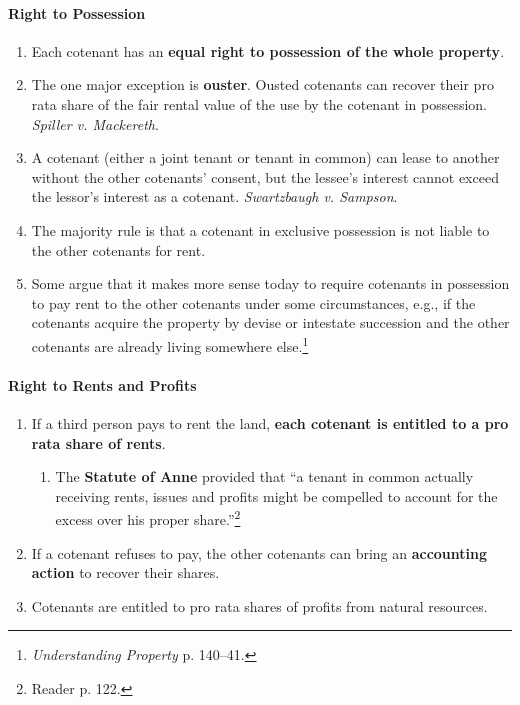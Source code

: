 \paragraph{Right to Possession}

\begin{enumerate}
    \item Each cotenant has an \textbf{equal right to possession of the whole 
    property}.
    \item The one major exception is \textbf{ouster}. Ousted cotenants can 
    recover their pro rata share of the fair rental value of the use by the 
    cotenant in possession. \emph{Spiller v. Mackereth}.
    \item A cotenant (either a joint tenant or tenant in common)  can lease to 
    another without the other cotenants' consent, but the lessee's interest 
    cannot exceed the lessor's interest as a cotenant.  \emph{Swartzbaugh v. 
    Sampson}.
    \item The majority rule is that a cotenant in exclusive possession is not 
    liable to the other cotenants for rent.
    \item Some argue that it makes more sense today to require cotenants in 
    possession to pay rent to the other cotenants under some circumstances, 
    e.g., if the cotenants acquire the property by devise or intestate 
    succession and the other cotenants are already living somewhere 
    else.\footnote{\emph{Understanding Property} p. 140--41.}
\end{enumerate}

\paragraph{Right to Rents and Profits}

\begin{enumerate}
    \item If a third person pays to rent the land, \textbf{each cotenant is entitled 
    to a pro rata share of rents}.
    \begin{enumerate}
        \item The \textbf{Statute of Anne} provided that ``a tenant in common 
        actually receiving rents, issues and profits might be compelled to 
        account for the excess over his proper share.''\footnote{Reader p. 
        122.}
    \end{enumerate}
    \item If a cotenant refuses to pay, the other cotenants can bring an 
    \textbf{accounting action} to recover their shares.
    \item Cotenants are entitled to pro rata shares of profits from natural 
    resources.
\end{enumerate}

